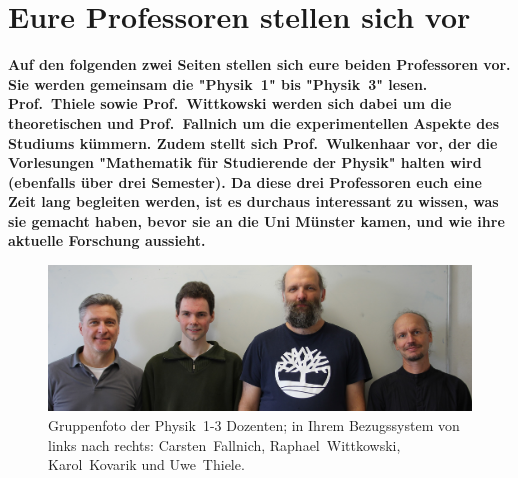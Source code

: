 \section[Eure Profs stellen sich vor]{Eure Professoren stellen sich vor}
\textbf{Auf den folgenden zwei Seiten stellen sich eure beiden Professoren vor.
    Sie werden gemeinsam die "Physik~1" bis "Physik~3" lesen.
    Prof.\ Thiele sowie Prof.\ Wittkowski werden sich dabei um die theoretischen und Prof.\ Fallnich um die experimentellen Aspekte des Studiums kümmern.
    Zudem stellt sich Prof.\ Wulkenhaar vor, der die Vorlesungen "Mathematik für Studierende der Physik" halten wird (ebenfalls über drei Semester).
	Da diese drei Professoren euch eine Zeit lang begleiten werden, ist es durchaus interessant zu wissen, was sie gemacht haben, bevor sie an die Uni Münster kamen, und wie ihre aktuelle Forschung aussieht.}

 \begin{figure}[b] %
	\centering
\includegraphics[width=0.8\columnwidth, height=0.25\textheight]{res/vorstellungsfotos/profs_ws23.jpg}
	\caption*{\centering Gruppenfoto der Physik~1-3 Dozenten; in Ihrem Bezugssystem von links nach rechts: Carsten~Fallnich, Raphael~Wittkowski, Karol~Kovarik und Uwe~Thiele.}
\end{figure}

